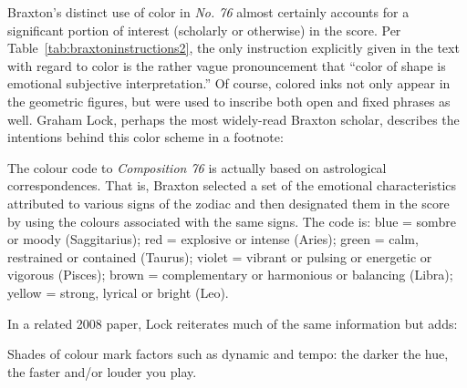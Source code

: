         Braxton's distinct use of color in \textit{No. 76} almost certainly accounts for a significant portion of interest (scholarly or otherwise) in the score. Per Table~\ref{tab:braxtoninstructions2}, the only instruction explicitly given in the text with regard to color is the rather vague pronouncement that ``color of shape is emotional subjective interpretation.'' Of course, colored inks not only appear in the geometric figures, but were used to inscribe both open and fixed phrases as well. Graham Lock, perhaps the most widely-read Braxton scholar, describes the intentions behind this color scheme in a footnote:
        
            \begin{smallquote}
                The colour code to \textit{Composition 76} is actually based on astrological correspondences. That is, Braxton selected a set of the emotional characteristics attributed to various signs of the zodiac and then designated them in the score by using the colours associated with the same signs. The code is: blue = sombre or moody (Saggitarius); red = explosive or intense (Aries); green = calm, restrained or contained (Taurus); violet = vibrant or pulsing or energetic or vigorous (Pisces); brown = complementary or harmonious or balancing (Libra); yellow = strong, lyrical or bright (Leo).\autocite[222]{Lock_1989}
            \end{smallquote}
        
        In a related 2008 paper, Lock reiterates much of the same information but adds:
        
            \begin{smallquote}
                Shades of colour mark factors such as dynamic and tempo: the darker the hue, the faster and/or louder you play.\autocite{Lock_2008}
            \end{smallquote}
    
